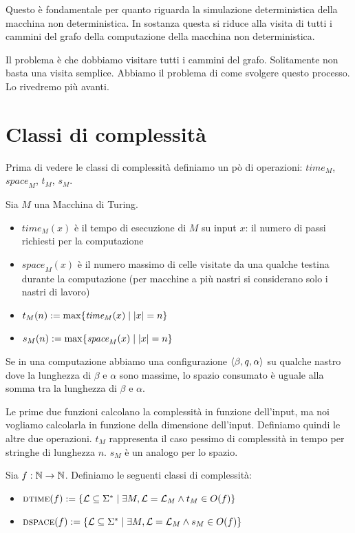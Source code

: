 Questo è fondamentale per quanto riguarda la simulazione deterministica della macchina non
deterministica. In sostanza questa si riduce alla visita di tutti i cammini del grafo della
computazione della macchina non deterministica.

Il problema è che dobbiamo visitare tutti i cammini del grafo. Solitamente non basta una visita
semplice. Abbiamo il problema di come svolgere questo processo. Lo rivedremo più avanti.

\section{Classi di complessità}

Prima di vedere le classi di complessità definiamo un pò di operazioni: $\textit{time}_{M}$,
$\textit{space}_{M}$, $t_{M}$, $s_{M}$.

\begin{defn}
    Sia $M$ una Macchina di Turing.
    \begin{itemize}
        \item $\textit{time}_{M}(x)$ è il tempo di esecuzione di $M$ su input $x$: il numero di
        passi richiesti per la computazione
        \item $\textit{space}_{M}(x)$ è il numero massimo di celle visitate da una qualche testina
        durante la computazione (per macchine a più nastri si considerano solo i nastri di lavoro)
        \item $t_{M}(n) := \max\{\textit{time}_{M}(x) \mid |x| = n\}$
        \item $s_{M}(n) := \max\{\textit{space}_{M}(x) \mid |x| = n\}$
    \end{itemize}
\end{defn}

Se in una computazione abbiamo una configurazione $\langle \beta, q, \alpha \rangle$ su qualche nastro dove
la lunghezza di $\beta$ e $\alpha$ sono massime, lo spazio consumato è uguale alla somma tra la
lunghezza di $\beta$ e $\alpha$.

Le prime due funzioni calcolano la complessità in funzione dell'input, ma noi vogliamo calcolarla
in funzione della dimensione dell'input. Definiamo quindi le altre due operazioni. $t_{M}$
rappresenta il caso pessimo di complessità in tempo per stringhe di lunghezza $n$. $s_{M}$ è un
analogo per lo spazio.

\begin{defn}
    Sia $f:\mathbb{N} \to \mathbb{N}$. Definiamo le seguenti classi di complessità:
    \begin{itemize}
        \item $\textsc{dtime}(f) := \{\mathcal{L} \subseteq \Sigma^{*} \mid \exists M, \mathcal{L} = \mathcal{L}_{M} \land
        t_{M} \in O(f)\}$
        \item $\textsc{dspace}(f) := \{\mathcal{L} \subseteq \Sigma^{*} \mid \exists M, \mathcal{L} = \mathcal{L}_{M} \land
        s_{M} \in O(f)\}$
    \end{itemize}
\end{defn}

